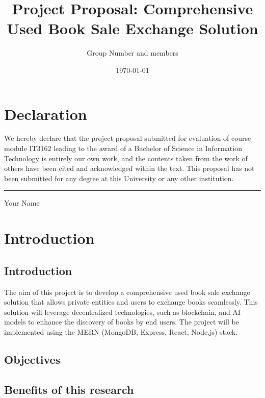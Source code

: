 \documentclass{article}
\begin{document}
\title{Project Proposal: Comprehensive Used Book Sale Exchange Solution}
\author{Group Number and members}
\date{ \today }
\maketitle

\newpage

\section*{Declaration}
We hereby declare that the project proposal submitted for evaluation of
course module IT3162 leading to the award of a Bachelor of Science in
Information Technology is entirely our own work, and the contents taken from
the work of others have been cited and acknowledged within the text. This
proposal has not been submitted for any degree at this University or any other
institution.

\vspace{2cm} %
\rule{5cm}{0.5pt} %
\linebreak
Your Name

\newpage

\tableofcontents
\newpage

\section{Introduction}
\subsection{Introduction}
The aim of this project is to develop a comprehensive used book sale exchange
solution that allows private entities and users to exchange books seamlessly.
This solution will leverage decentralized technologies, such as blockchain, and
AI models to enhance the discovery of books by end users. The project will be
implemented using the MERN (MongoDB, Express, React, Node.js) stack.

\subsection{Objectives}


\subsection{Benefits of this research}

\end{document}
